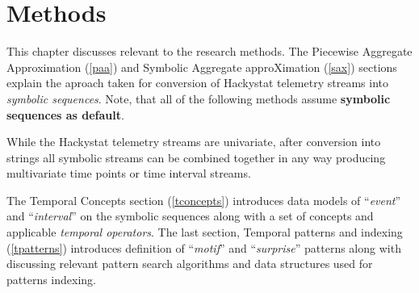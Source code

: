 \chapter{Methods}
This chapter discusses relevant to the research methods. The Piecewise Aggregate Approximation (\ref{paa}) and Symbolic Aggregate approXimation (\ref{sax}) sections explain the aproach taken for conversion of Hackystat telemetry streams into \textit{symbolic sequences}. Note, that all of the following methods assume \textbf{symbolic sequences as default}. 

While the Hackystat telemetry streams are univariate, after conversion into strings all symbolic streams can be combined together in any way producing multivariate time points or time interval streams.

The Temporal Concepts section (\ref{tconcepts}) introduces data models of ``\textit{event}'' and ``\textit{interval}'' on the symbolic sequences along with a set of concepts and applicable \textit{temporal operators}. 
	The last section, Temporal patterns  and indexing (\ref{tpatterns}) introduces definition of ``\textit{motif}'' and ``\textit{surprise}'' patterns along with discussing relevant pattern search algorithms and data structures used for patterns indexing.